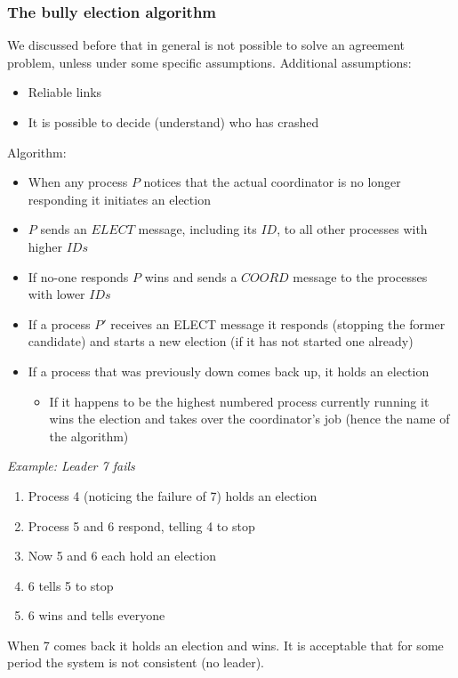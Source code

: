 \documentclass[10pt,a4paper]{article}
\begin{document}
\subsubsection{The bully election algorithm}
We discussed before that in general is not possible to solve an agreement problem, unless under some specific assumptions.
Additional assumptions:
\begin{itemize}
	\item Reliable links
	\item It is possible to decide (understand) who has crashed
\end{itemize}
Algorithm:
\begin{itemize}
	\item When any process $P$ notices that the actual coordinator is no longer responding it initiates an election
	\item $P$ sends an $ELECT$ message, including its $ID$, to all other processes with higher $IDs$
	\item If no-one responds $P$ wins and sends a $COORD$ message to the processes with lower $IDs$
	\item If a process $P'$ receives an ELECT message it responds (stopping the former candidate) and starts a new election (if it has not started one already)
	\item If a process that was previously down comes back up, it holds an election
	\begin{itemize}
		\item If it happens to be the highest numbered process currently running it wins the election and takes over the coordinator's job (hence the name of the algorithm)
	\end{itemize}
\end{itemize}
\textit{Example: Leader 7 fails}
\begin{enumerate}
	\item Process 4 (noticing the failure of 7) holds an election
	\item Process 5 and 6 respond, telling 4 to stop
	\item Now 5 and 6 each hold an election
	\item 6 tells 5 to stop
	\item 6 wins and tells everyone
\end{enumerate}
When 7 comes back it holds an election and wins. It is acceptable that for some period the system is not consistent (no leader).
\end{document}
